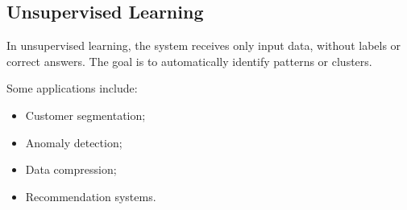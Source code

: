\subsection{Unsupervised Learning}

In unsupervised learning, the system receives only input data, without labels
or correct answers. The goal is to automatically identify patterns or clusters.

Some applications include:

\begin{itemize}
    \item Customer segmentation;
    \item Anomaly detection;
    \item Data compression;
    \item Recommendation systems.
\end{itemize} 
